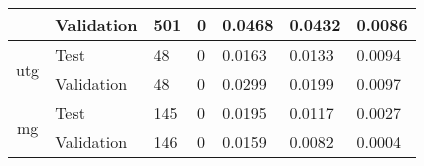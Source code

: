 \begin{table}[H]
\begin{tabular}{|c|l|l|llll|}
                                           & Validation                                             & 501                                              & \multicolumn{1}{l|}{0}                  & \multicolumn{1}{l|}{0.0468}               & \multicolumn{1}{l|}{0.0432}               & 0.0086               \\ \hline
\multirow{2}{*}{utg}                       & Test                                                   & 48                                               & \multicolumn{1}{l|}{0}                  & \multicolumn{1}{l|}{0.0163}               & \multicolumn{1}{l|}{0.0133}               & 0.0094               \\ \cline{2-7} 
                                           & Validation                                             & 48                                               & \multicolumn{1}{l|}{0}                  & \multicolumn{1}{l|}{0.0299}               & \multicolumn{1}{l|}{0.0199}               & 0.0097               \\ \hline
\multirow{2}{*}{mg}                        & Test                                                   & 145                                              & \multicolumn{1}{l|}{0}                  & \multicolumn{1}{l|}{0.0195}               & \multicolumn{1}{l|}{0.0117}               & 0.0027               \\ \cline{2-7} 
                                           & Validation                                             & 146                                              & \multicolumn{1}{l|}{0}                  & \multicolumn{1}{l|}{0.0159}               & \multicolumn{1}{l|}{0.0082}               & 0.0004               \\ \hline
\end{tabular}
\label{tab:CodeBaselineStdDev}
\end{table}

